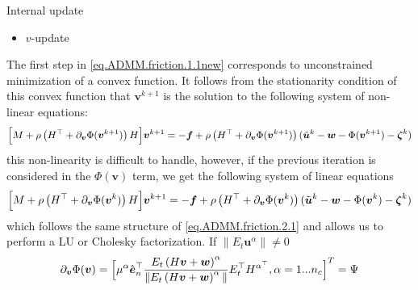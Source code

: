 \documentclass[8pt,red]{beamer}
\theoremstyle{plain}
\theoremstyle{definition}
\theoremstyle{remark}
\newcommand{\bi}[1]{\ensuremath{\boldsymbol{#1}}}
\begin{document}
\begin{frame}{Internal update}
\begin{itemize}
\item $v$-update
\end{itemize}
The first step in \eqref{eq.ADMM.friction.1.1new} corresponds to 
unconstrained minimization of a convex function. 
It follows from the stationarity condition of this convex 
function that $\bi{v}^{k+1}$ is the solution to the following system of 
non-linear equations: 
\begin{align}
  \Bigl[ M + 
  \rho \left( H^{\top} + \partial_{\bi{v}} \Phi(\bi{v}^{k+1}) \right) H \Bigr] \bi{v}^{k+1} 
  = -\bi{f} 
  + \rho \left( H^{\top} + \partial_{\bi{v}} \Phi(\bi{v}^{k+1}) \right) (\tilde{\bi{u}}^k - \bi{w} - \Phi(\bi{v}^{k+1}) - \bi{\zeta}^k)
\end{align}
this non-linearity is difficult to handle, however, if the previous iteration is considered in the $\Phi(\bi{v})$ term, we get the following system of linear equations
\begin{align}
  \Bigl[ M + 
  \rho \left( H^{\top} + \partial_{\bi{v}} \Phi(\bi{v}^{k}) \right) H \Bigr] \bi{v}^{k+1} 
  = -\bi{f} 
  + \rho \left( H^{\top} + \partial_{\bi{v}} \Phi(\bi{v}^{k}) \right) (\tilde{\bi{u}}^k - \bi{w} - \Phi(\bi{v}^{k}) - \bi{\zeta}^k)
\end{align}
which follows the same structure of \eqref{eq.ADMM.friction.2.1} and allows us to perform a LU or Cholesky factorization. If $\| E_{t} \bi{u}^{\alpha} \| \neq 0$
\begin{align}
  \partial_{\bi{v}} \Phi(\bi{v})
  = \Bigl[ \mu^{\alpha} \hat{\bi{e}}_{n}^{\top}
  \frac{E_{t} \left( H \bi{v} + \bi{w} \right)^{\alpha}}{\| E_{t} \left( H \bi{v} + \bi{w} \right)^{\alpha} \|}
  E_{t}^{\top} H^{\alpha^{\top}}, \alpha = 1...n_{c} \Bigr]^{T} = \Psi
\end{align}
\end{frame}
\end{document}
